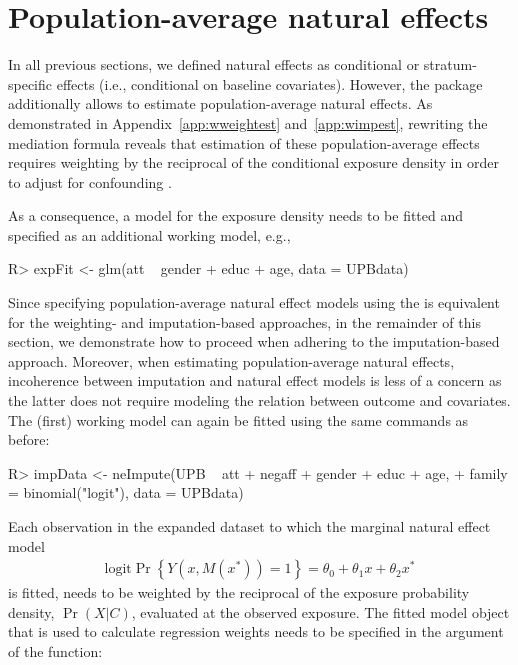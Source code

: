 \documentclass[nojss]{jss}
\begin{document}
\section{Population-average natural effects}\label{popavg}
In all previous sections, we defined natural effects as conditional or stratum-specific effects (i.e., conditional on baseline covariates). However, the  package additionally allows to estimate population-average natural effects. As demonstrated in Appendix~\ref{app:wweightest} and~\ref{app:wimpest}, rewriting the mediation formula reveals that estimation of these population-average effects requires weighting by the reciprocal of the conditional exposure density in order to adjust for confounding \citep[also see][]{Albert2012a, Vansteelandt2012f}.
\par As a consequence, a model for the exposure density needs to be fitted and specified as an additional working model, e.g.,
\begin{Schunk}
\begin{Sinput}
R> expFit <- glm(att ~ gender + educ + age, data = UPBdata)
\end{Sinput}
\end{Schunk}
Since specifying population-average natural effect models using the  is equivalent for the weighting- and imputation-based approaches, in the remainder of this section, we demonstrate how to proceed when adhering to the imputation-based approach. Moreover, when estimating population-average natural effects, incoherence between imputation and natural effect models is less of a concern as the latter does not require modeling the relation between outcome and covariates. The (first) working model can again be fitted using the same commands as before:
\begin{Schunk}
\begin{Sinput}
R> impData <- neImpute(UPB ~ att + negaff + gender + educ + age,
+    family = binomial("logit"), data = UPBdata)
\end{Sinput}
\end{Schunk}
Each observation in the expanded dataset to which the marginal natural effect model
\begin{align}\label{eq:nemodelweighted}
\mbox{logit} \Pr\left\{Y(x,M(x^*))=1\right\} = \theta_0 + \theta_1 x + \theta_2 x^*
\end{align}
is fitted, needs to be weighted by the reciprocal of the exposure probability density, $\Pr(X|C)$, evaluated at the observed exposure. The fitted model object that is used to calculate regression weights needs to be specified in the  argument of the  function:
\end{document}

